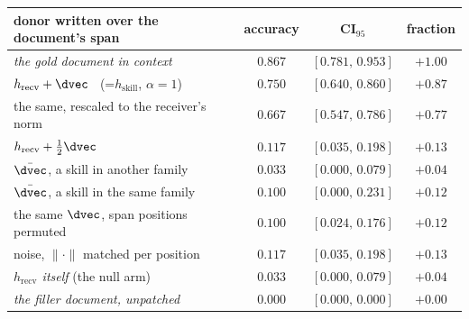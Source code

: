 \begin{tabular}{@{}lccc@{}}
\toprule
donor written over the document's span & accuracy & CI$_{95}$ & fraction \\
\midrule
\emph{the gold document in context} & $0.867$ & $[0.781,\,0.953]$ & $+1.00$ \\
$h_{\text{recv}}+\dvec$ \ (=$h_{\text{skill}}$, $\alpha=1$) & $0.750$ & $[0.640,\,0.860]$ & $+0.87$ \\
the same, rescaled to the receiver's norm & $0.667$ & $[0.547,\,0.786]$ & $+0.77$ \\
$h_{\text{recv}}+\tfrac12\dvec$ & $0.117$ & $[0.035,\,0.198]$ & $+0.13$ \\
$\bar{\dvec}$, a skill in another family & $0.033$ & $[0.000,\,0.079]$ & $+0.04$ \\
$\bar{\dvec}$, a skill in the same family & $0.100$ & $[0.000,\,0.231]$ & $+0.12$ \\
the same $\dvec$, span positions permuted & $0.100$ & $[0.024,\,0.176]$ & $+0.12$ \\
noise, $\|\cdot\|$ matched per position & $0.117$ & $[0.035,\,0.198]$ & $+0.13$ \\
\emph{$h_{\text{recv}}$ itself} (the null arm) & $0.033$ & $[0.000,\,0.079]$ & $+0.04$ \\
\emph{the filler document, unpatched} & $0.000$ & $[0.000,\,0.000]$ & $+0.00$ \\
\bottomrule
\end{tabular}
